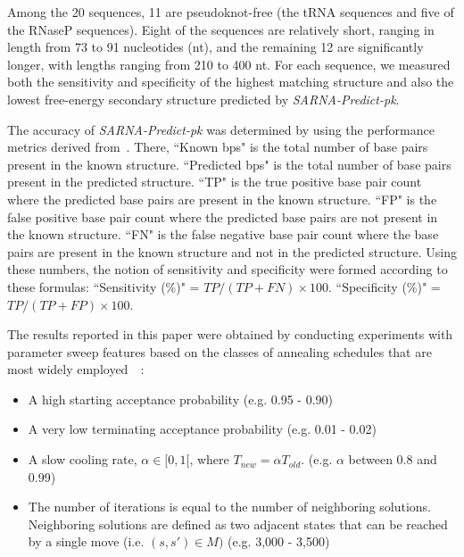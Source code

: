 \documentclass{doublecol-new}
\theoremstyle{TH}{
\newtheorem{lemma}{Lemma}
\newtheorem{theorem}[lemma]{Theorem}
\newtheorem{corrolary}[lemma]{Corrolary}
\newtheorem{conjecture}[lemma]{Conjecture}
\newtheorem{proposition}[lemma]{Proposition}
\newtheorem{claim}[lemma]{Claim}
\newtheorem{stheorem}[lemma]{Wrong Theorem}
\newtheorem{algorithm}{Algorithm}
}
\theoremstyle{THrm}{
\newtheorem{definition}{Definition}
\newtheorem{question}{Question}
\newtheorem{remark}{Remark}
\newtheorem{scheme}{Scheme}
}
\theoremstyle{THhit}{
\newtheorem{case}{Case}[section]
}
\begin{document}
Among the 20 sequences, 11 are pseudoknot-free (the tRNA sequences and 
five of the RNaseP sequences). Eight of the sequences are relatively short,
ranging in length from 73 to 91 nucleotides (nt), and the remaining 12 are significantly
longer, with lengths ranging from 210 to 400 nt.
For each sequence, we measured both the sensitivity and specificity of the highest matching structure and
also the lowest free-energy secondary structure predicted by {\em SARNA-Predict-pk}.

The accuracy of {\em SARNA-Predict-pk} was determined by using the performance
metrics derived from~\cite{PierreBaldi_2000}. There,
``Known bps" is the total number of base pairs present in the known structure.
``Predicted bps" is the total number of base pairs present in the predicted structure.
``TP" is the true positive base pair count where the predicted base  pairs are present
in the known structure.
``FP" is the false positive base pair count where the predicted base pairs are not present
in the known structure.
``FN" is the false negative base pair count where the base pairs are present in the known
structure and not in the predicted structure. Using these numbers, the notion of
sensitivity and specificity were formed
according to these formulas:
``Sensitivity (\%)" = $TP/(TP+FN) \times 100$.
``Specificity (\%)" = $TP/(TP + FP) \times 100$.

The results reported in this paper were obtained by conducting experiments with parameter sweep
features based on the classes of annealing schedules that are most widely employed~\cite{li1997}~\cite{aarts1989}:
\begin{itemize}
\item A high starting acceptance probability (e.g. 0.95 - 0.90)
\item A very low terminating acceptance probability (e.g. 0.01 - 0.02)
\item A slow cooling rate, $\alpha \in [0,1[$, where $T_{new} = \alpha T_{old}$.
  (e.g. $\alpha$ between 0.8 and 0.99)
\item The number of iterations is equal to the number of neighboring solutions.
Neighboring solutions are defined as two adjacent states that can be reached
by a single move (i.e. $(s,s') \in M)$ (e.g. 3,000 - 3,500)
\end{itemize}
\end{document}
